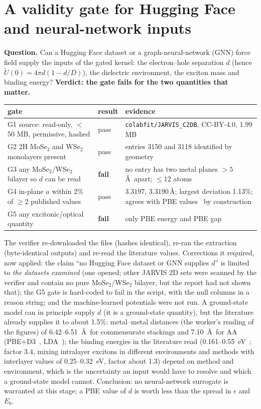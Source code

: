 \documentclass[11pt,a4paper]{article}
\begin{document}
\section{A validity gate for Hugging Face and neural-network inputs}\label{sec:hf}

\textbf{Question.} Can a Hugging Face dataset or a graph-neural-network (GNN) force field supply the inputs of the gated kernel: the
electron--hole separation $d$ (hence $\tilde U(0)=4\pi d(1-d/D)$), the dielectric environment, the exciton mass and binding energy?
\textbf{Verdict: the gate fails for the two quantities that matter.}

\begin{center}\small
\begin{tabular}{@{}p{}p{}p{}@{}}
\toprule
gate & result & evidence \\ \midrule
G1 source: read-only, $<$50 MB, permissive, hashed & pass & \texttt{colabfit/JARVIS\_C2DB}, CC-BY-4.0, 1.99 MB \\
G2 2H MoSe$_2$ and WSe$_2$ monolayers present & pass & entries 3150 and 3118 identified by geometry \\
G3 any MoSe$_2$/WSe$_2$ bilayer so $d$ can be read & \textbf{fail} & no entry has two metal planes $>5$\,\AA\ apart; $\le12$ atoms \\
G4 in-plane $a$ within 2\% of $\ge2$ published values & pass & $3.3197$, $3.3190$\,\AA; largest deviation 1.13\%; agrees with PBE values~\cite{Kormanyos2015} by construction \\
G5 any excitonic/optical quantity & \textbf{fail} & only PBE energy and PBE gap \\
\bottomrule
\end{tabular}
\end{center}

The verifier re-downloaded the files (hashes identical), re-ran the extraction (byte-identical outputs) and re-read the literature
values. Corrections it required, now applied: the claim ``no Hugging Face dataset or GNN supplies $d$'' is limited to \emph{the datasets
examined} (one opened; other JARVIS 2D sets were scanned by the verifier and contain no pure MoSe$_2$/WSe$_2$ bilayer, but the report
had not shown that); the G5 gate is hard-coded to fail in the script, with the null columns in a reason string; and the machine-learned
potentials were not run. A ground-state model can in principle supply $d$ (it is a ground-state quantity), but the literature already
supplies it to about 1.5\%: metal--metal distances (the worker's reading of the figures) of 6.42--6.51~\AA\ for commensurate stackings and 7.10~\AA\ for AA
(PBE+D3~\cite{Gillen2018}, LDA~\cite{Torun2018}); the binding energies in the literature read (0.161--0.55~eV~\cite{Stier2018,Ugeda2014,Torun2018}; factor 3.4, mixing
intralayer excitons in different environments and methods with interlayer values of 0.25--0.32~eV, factor about 1.3) depend on method
and environment, which is the uncertainty an input would have to resolve and which a ground-state model cannot. Conclusion: no neural-network surrogate is warranted at this stage; a PBE value of $d$ is worth less than the
spread in $\epsilon$ and $E_b$.
\end{document}
